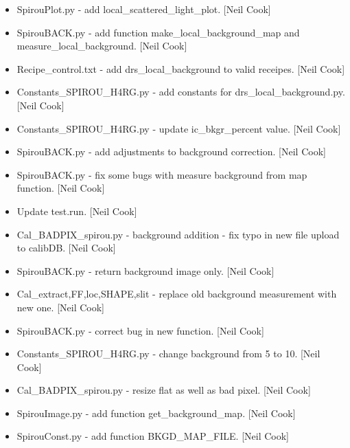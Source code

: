 \documentclass[a4paper,10pt,english]{report}
\begin{document}
\begin{itemize}
\item {} 
SpirouPlot.py - add local\_scattered\_light\_plot. {[}Neil Cook{]}

\item {} 
SpirouBACK.py - add function make\_local\_background\_map and
measure\_local\_background. {[}Neil Cook{]}

\item {} 
Recipe\_control.txt - add drs\_local\_background to valid receipes. {[}Neil
Cook{]}

\item {} 
Constants\_SPIROU\_H4RG.py - add constants for drs\_local\_background.py.
{[}Neil Cook{]}

\item {} 
Constants\_SPIROU\_H4RG.py - update ic\_bkgr\_percent value. {[}Neil Cook{]}

\item {} 
SpirouBACK.py - add adjustments to background correction. {[}Neil Cook{]}

\item {} 
SpirouBACK.py - fix some bugs with measure background from map
function. {[}Neil Cook{]}

\item {} 
Update test.run. {[}Neil Cook{]}

\item {} 
Cal\_BADPIX\_spirou.py - background addition - fix typo in new file
upload to calibDB. {[}Neil Cook{]}

\item {} 
SpirouBACK.py - return background image only. {[}Neil Cook{]}

\item {} 
Cal\_extract,FF,loc,SHAPE,slit - replace old background measurement
with new one. {[}Neil Cook{]}

\item {} 
SpirouBACK.py - correct bug in new function. {[}Neil Cook{]}

\item {} 
Constants\_SPIROU\_H4RG.py - change background from 5 to 10. {[}Neil Cook{]}

\item {} 
Cal\_BADPIX\_spirou.py - resize flat as well as bad pixel. {[}Neil Cook{]}

\item {} 
SpirouImage.py - add function get\_background\_map. {[}Neil Cook{]}

\item {} 
SpirouConst.py - add function BKGD\_MAP\_FILE. {[}Neil Cook{]}


\end{itemize}
\end{document}

